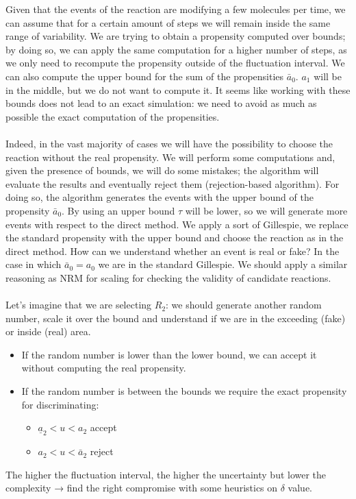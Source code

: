 \noindent
Given that the events of the reaction are modifying a few molecules per time, we can assume that for a certain amount of steps we will remain inside the same range of variability.
We are trying to obtain a propensity computed over bounds; by doing so, we can apply the same computation for a higher number of steps, as we only need to recompute the propensity outside of the fluctuation interval.
We can also compute the upper bound for the sum of the propensities $\bar{a}_0$.
$a_1$ will be in the middle, but we do not want to compute it.
It seems like working with these bounds does not lead to an exact simulation: we need to avoid as much as possible the exact computation of the propensities.
\\
\\
\noindent
Indeed, in the vast majority of cases we will have the possibility to choose the reaction without the real propensity.
We will perform some computations and, given the presence of bounds, we will do some mistakes; the algorithm will evaluate the results and eventually reject them (rejection-based algorithm).
For doing so, the algorithm generates the events with the upper bound of the propensity $\bar{a}_0$.
By using an upper bound $\tau$ will be lower, so we will generate more events with respect to the direct method.
We apply a sort of Gillespie, we replace the standard propensity with the upper bound and choose the reaction as in the direct method.
How can we understand whether an event is real or fake? In the case in which $\bar{a}_0 = a_0$ we are in the standard Gillespie.
We should apply a similar reasoning as NRM for scaling for checking the validity of candidate reactions.
\\
\\
\noindent
Let's imagine that we are selecting $R_2$: we should generate another random number, scale it over the bound and understand if we are in the exceeding (fake) or inside (real) area.

\begin{itemize}
  \item If the random number is lower than the lower bound, we can accept it without computing the real propensity.
  \item If the random number is between the bounds we require the exact propensity for discriminating:

  \begin{itemize}
    \item $\underline{a}_2 < u < a_2$ accept \item $a_2 < u < \bar{a}_2$ reject
  \end{itemize}

\end{itemize}

\noindent
The higher the fluctuation interval, the higher the uncertainty but lower the complexity → find the right compromise with some heuristics on $\delta$ value.
